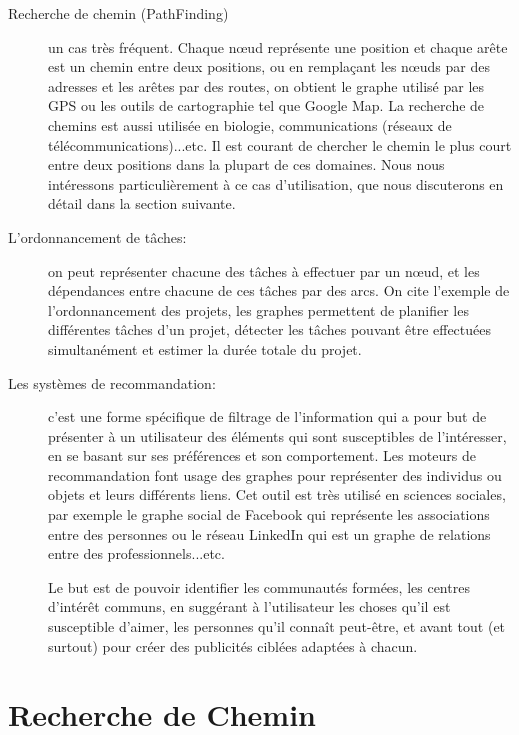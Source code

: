 \begin{description}


\item[Recherche de chemin (PathFinding)]
un cas très fréquent. Chaque nœud représente une position et chaque arête est un chemin entre deux positions, ou en remplaçant les nœuds par des adresses et les arêtes par des routes, on obtient le graphe utilisé par les GPS ou les outils de cartographie tel que Google Map.
La recherche de chemins est aussi utilisée en biologie, communications (réseaux de télécommunications)...etc.
Il est courant de chercher le chemin le plus court entre deux positions dans la plupart de ces domaines. Nous nous intéressons particulièrement à ce cas d'utilisation, que nous discuterons en détail dans la section suivante.


\item[L'ordonnancement de tâches:]
on peut représenter chacune des tâches à effectuer par un nœud, et les dépendances entre chacune de ces tâches par des arcs.
On cite l'exemple de l'ordonnancement des projets, les graphes permettent de planifier les différentes tâches d'un projet, détecter les tâches pouvant être effectuées simultanément et estimer la durée totale du projet.

\item[Les systèmes de recommandation:]
c'est une forme spécifique de filtrage de l'information qui a pour but de présenter à un utilisateur des éléments qui sont susceptibles de l'intéresser, en se basant sur ses préférences et son comportement.
Les moteurs de recommandation font usage des graphes pour représenter des individus ou objets et leurs différents liens. Cet outil est très utilisé en sciences sociales, par exemple le graphe social de Facebook qui représente les associations entre des personnes ou le réseau LinkedIn qui est un graphe de relations entre des professionnels...etc.

Le but est de pouvoir identifier les communautés formées, les centres d'intérêt communs, en suggérant à l'utilisateur les choses qu'il est susceptible d'aimer, les personnes qu'il connaît peut-être, et avant tout (et surtout) pour créer des publicités ciblées adaptées à chacun.

\end{description}

\section{Recherche de Chemin}

